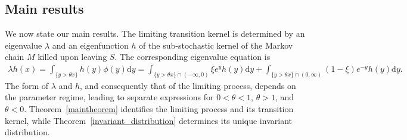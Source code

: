 \documentclass[12pt]{article}
\newcommand{\1}{\mathds{1}}
\renewcommand{\d}{\mathrm{d}}
\theoremstyle{definition}
\theoremstyle{plain}
\theoremstyle{remark}
\begin{document}
\subsection{Main results}
We now state our main results. The limiting transition kernel is determined by an eigenvalue $\lambda$ and an eigenfunction $h$ of the
sub-stochastic kernel of the Markov chain $M$ killed upon leaving $S$. The
corresponding eigenvalue equation is
\begin{align}\label{eq_eigenfunction}
    \lambda h(x)=\int_{\{y>\theta x\}}\!\!\!\!\!\!\!h(y)\phi(y)\d y=\int_{\{y>\theta x\}\cap(-\infty,0)}\!\!\!\!\!\!\!\xi  e^yh(y)\d y+\int_{\{y>\theta x\}\cap(0,\infty)}\!\!\!\!\!\!\!(1-\xi)  e^{-y}h(y)\d y.
\end{align}
The form of $\lambda$ and $h$, and consequently that of the limiting process, depends on
the parameter regime, leading to separate expressions for $0<\theta<1$,
$\theta>1$, and $\theta<0$. Theorem~\ref{maintheorem} identifies the
limiting process and its transition kernel, while
Theorem~\ref{invariant_distribution} determines its unique invariant
distribution.
\end{document}
